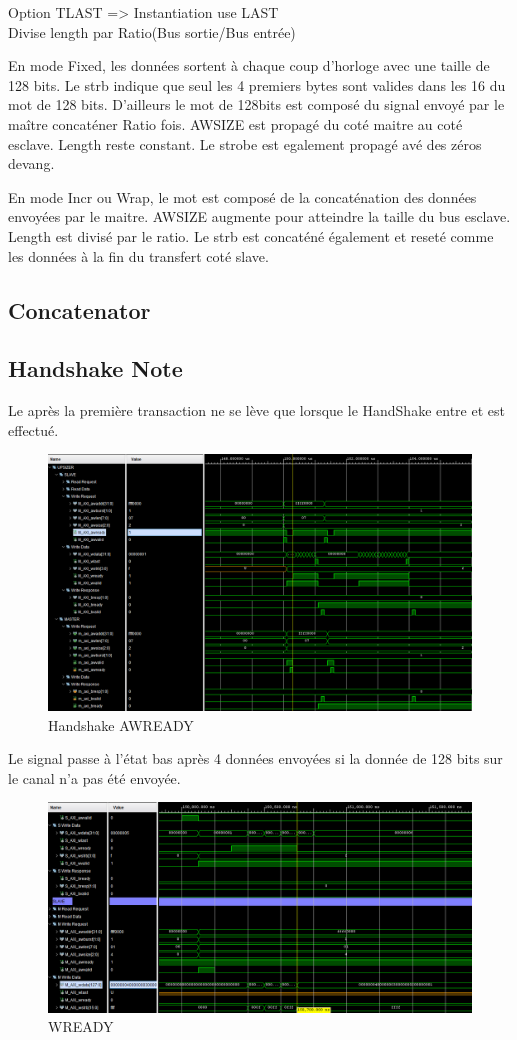 Option TLAST => Instantiation use LAST \\
Divise length par Ratio(Bus sortie/Bus entrée)




En mode Fixed, les données sortent à chaque coup d'horloge avec une taille de 128 bits. Le strb indique que seul les 4 premiers bytes sont valides dans les 16 du mot de 128 bits. D'ailleurs le mot de 128bits est composé du signal envoyé par le maître concaténer Ratio fois. AWSIZE est propagé du coté maitre au coté esclave. Length reste constant. Le strobe est egalement propagé avé des zéros devang.

En mode Incr ou Wrap, le mot est composé de la concaténation des données envoyées par le maitre. AWSIZE augmente pour atteindre la taille du bus esclave. Length est divisé par le ratio. Le strb est concaténé également et reseté comme les données à la fin du transfert coté slave.

\subsection{Concatenator}

\subsection{Handshake Note}

Le  après la première transaction ne se lève que lorsque le HandShake entre  et  est effectué.

\begin{figure}[H]
    \centering
    \includegraphics[width=\linewidth]{images/aw_ready_condition.PNG}
    \caption{Handshake AWREADY}
\end{figure}

Le signal  passe à l'état bas après 4 données envoyées si la donnée de 128 bits sur le canal  n'a pas été envoyée.

\begin{figure}[H]
    \centering
    \includegraphics[width=\linewidth]{images/w_ready_condition.PNG}
    \caption{WREADY}
\end{figure}